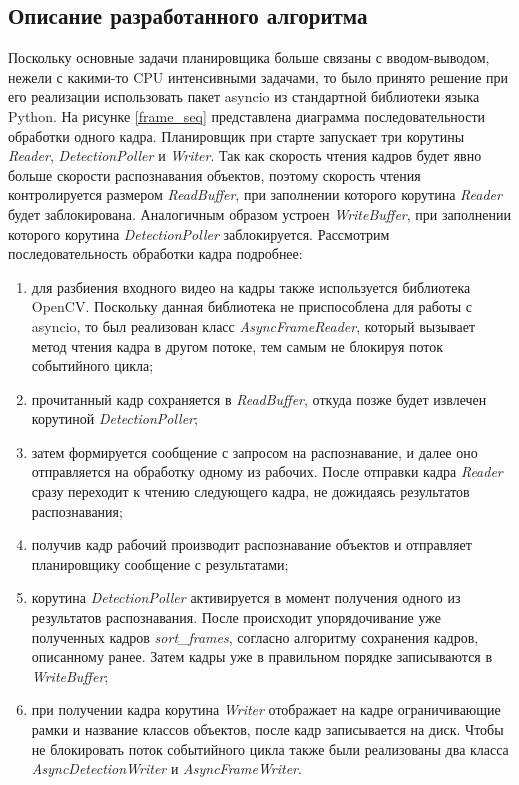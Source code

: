 \subsection{Описание разработанного алгоритма}

Поскольку основные задачи планировщика больше связаны с вводом-выводом, нежели с какими-то CPU интенсивными задачами, 
то было принято решение при его реализации использовать пакет asyncio из стандартной библиотеки языка Python. На рисунке
\ref{frame_seq} представлена диаграмма последовательности обработки одного кадра. Планировщик при старте запускает три 
корутины \emph{Reader}, \emph{DetectionPoller} и \emph{Writer}. Так как скорость чтения кадров будет явно больше скорости
распознавания объектов, поэтому скорость чтения контролируется размером \emph{ReadBuffer}, при заполнении которого корутина
\emph{Reader} будет заблокирована. Аналогичным образом устроен \emph{WriteBuffer}, при заполнении которого корутина 
\emph{DetectionPoller} заблокируется. Рассмотрим последовательность обработки кадра подробнее:


\begin{enumerate}
\item для разбиения входного видео на кадры также используется библиотека OpenCV. Поскольку данная библиотека не 
приспособлена для работы с asyncio, то был реализован класс \emph{AsyncFrameReader}, который вызывает метод чтения 
кадра в другом потоке, тем самым не блокируя поток событийного цикла;
\item прочитанный кадр сохраняется в \emph{ReadBuffer}, откуда позже будет извлечен корутиной \emph{DetectionPoller};
\item затем формируется сообщение с запросом на распознавание, и далее оно отправляется на обработку одному из рабочих.
После отправки кадра \emph{Reader} сразу переходит к чтению следующего кадра, не дожидаясь результатов распознавания;
\item получив кадр рабочий производит распознавание объектов и отправляет планировщику сообщение с результатами;
\item корутина \emph{DetectionPoller} активируется в момент получения одного из результатов распознавания. После 
происходит упорядочивание уже полученных кадров \emph{sort\_frames}, согласно алгоритму сохранения кадров, описанному 
ранее. Затем кадры уже в правильном порядке записываются в \emph{WriteBuffer};
\item при получении кадра корутина \emph{Writer} отображает на кадре ограничивающие рамки и название классов объектов, 
после кадр записывается на диск. Чтобы не блокировать поток событийного цикла также были реализованы два класса 
\emph{AsyncDetectionWriter} и \emph{AsyncFrameWriter}.
\end{enumerate}

\clearpage
